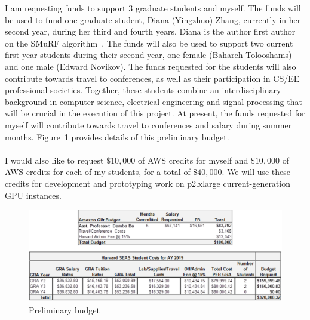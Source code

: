 \documentclass[12pt]{article}
\begin{document}
I am requesting funds to support $3$ graduate students and myself. The funds will be used to fund one graduate student, Diana (Yingzhuo) Zhang, currently in her second year, during her third and fourth years. Diana is the author first author on the SMuRF algorithm~\cite{smurf2017}. The funds will also be used to support two current first-year students during their second year, one female (Bahareh Tolooshams) and one male (Edward Novikov). The funds requested for the students will also contribute towards travel to conferences, as well as their participation in CS/EE professional societies. Together, these students combine an interdisciplinary background in computer science, electrical engineering and signal processing that will be crucial in the execution of this project. At present, the funds requested for myself will contribute towards travel to conferences and salary during summer months. Figure~\ref{fig:budget} provides details of this preliminary budget. 
\\
\\
I would also like to request $\$10,000$ of AWS credits for myself and $\$10,000$ of AWS credits for each of my students, for a total of $\$40,000$. We will use these credits for development and prototyping work on p2.xlarge current-generation GPU instances. 

\begin{figure}[!h]
  \begin{center}
    \includegraphics[scale=0.8]{AmznBudget.eps}
  \end{center}
  \vspace{-0.3in}
  \caption{Preliminary budget}
  \label{fig:budget}
\end{figure}

\end{document}
